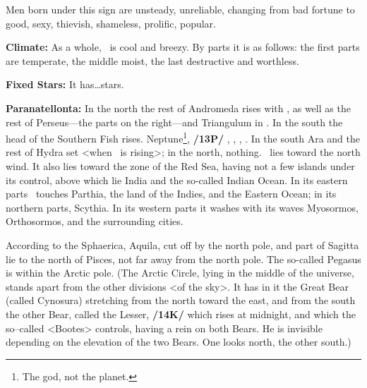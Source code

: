 Men born under this sign are unsteady, unreliable, changing from bad fortune to good, sexy, thievish, shameless, prolific, popular.

\textbf{Climate:} As a whole, \Pisces\, is cool and breezy. By parts it is as follows: the first parts are temperate, the
middle moist, the last destructive and worthless. 

\textbf{Fixed Stars:} It has…stars. 

\textbf{Paranatellonta:} In the north the rest of Andromeda rises with \Pisces, as well as the rest of Perseus—the parts on the right—and Triangulum in \Aries. In the south the head of the Southern Fish rises. Neptune\footnote{The god, not the planet.}, \textbf{/13P/} \Mars, \Mercury, \Venus, \Jupiter. In the south Ara and the rest of Hydra set <when \Pisces\, is rising>; in the north, nothing. \Pisces\, lies toward the north wind. It also lies toward the zone of the Red Sea, having not a few islands under its control, above which lie India and the so-called Indian Ocean. In its eastern parts \Pisces\, touches Parthia, the land of the Indies, and the Eastern Ocean; in its northern parts, Scythia. In its western parts it washes with its waves Myosormos, Orthosormos, and the surrounding cities.

According to the Sphaerica, Aquila, cut off by the north pole, and part of Sagitta lie to the north of Pisces, not far away from the north pole. The so-called Pegasus is within the Arctic pole. (The Arctic Circle, lying in the middle of the universe, stands apart from the other divisions <of the sky>. It has in it the Great Bear (called Cynosura) stretching from the north toward the east, and from the south the other Bear, called the Lesser, \textbf{/14K/} which rises at midnight, and which the so–called  <Bootes> controls, having a rein on both Bears. He is invisible depending on the elevation of the two Bears. One looks north, the other south.) 

